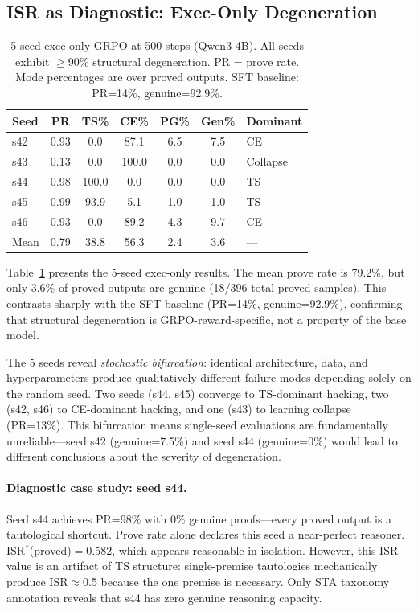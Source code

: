 \documentclass[11pt,a4paper]{article}
\begin{document}
\subsection{ISR as Diagnostic: Exec-Only Degeneration}
\label{sec:diagnostic}

\begin{table}[t]
\centering
\caption{5-seed exec-only GRPO at 500 steps (Qwen3-4B). All seeds exhibit $\geq$90\% structural degeneration. PR = prove rate. Mode percentages are over proved outputs. SFT baseline: PR=14\%, genuine=92.9\%.}
\label{tab:five-seed-taxonomy}
\small
\begin{tabular}{lcccccl}
\toprule
Seed & PR & TS\% & CE\% & PG\% & Gen\% & Dominant \\
\midrule
s42 & 0.93 & 0.0 & 87.1 & 6.5 & 7.5 & CE \\
s43 & 0.13 & 0.0 & 100.0 & 0.0 & 0.0 & Collapse \\
s44 & 0.98 & 100.0 & 0.0 & 0.0 & 0.0 & TS \\
s45 & 0.99 & 93.9 & 5.1 & 1.0 & 1.0 & TS \\
s46 & 0.93 & 0.0 & 89.2 & 4.3 & 9.7 & CE \\
\midrule
Mean & 0.79 & 38.8 & 56.3 & 2.4 & 3.6 & --- \\
\bottomrule
\end{tabular}
\end{table}

Table~\ref{tab:five-seed-taxonomy} presents the 5-seed exec-only results.
The mean prove rate is 79.2\%, but only 3.6\% of proved outputs are genuine (18/396 total proved samples).
This contrasts sharply with the SFT baseline (PR=14\%, genuine=92.9\%), confirming that structural degeneration is GRPO-reward-specific, not a property of the base model.

The 5 seeds reveal \emph{stochastic bifurcation}: identical architecture, data, and hyperparameters produce qualitatively different failure modes depending solely on the random seed.
Two seeds (s44, s45) converge to TS-dominant hacking, two (s42, s46) to CE-dominant hacking, and one (s43) to learning collapse (PR=13\%).
This bifurcation means single-seed evaluations are fundamentally unreliable---seed s42 (genuine=7.5\%) and seed s44 (genuine=0\%) would lead to different conclusions about the severity of degeneration.

\paragraph{Diagnostic case study: seed s44.}
Seed s44 achieves PR=98\% with 0\% genuine proofs---every proved output is a tautological shortcut.
Prove rate alone declares this seed a near-perfect reasoner.
ISR$^*$(proved)$=$0.582, which appears reasonable in isolation.
However, this ISR value is an artifact of TS structure: single-premise tautologies mechanically produce ISR$\approx$0.5 because the one premise is necessary.
Only STA taxonomy annotation reveals that s44 has zero genuine reasoning capacity.
\end{document}
